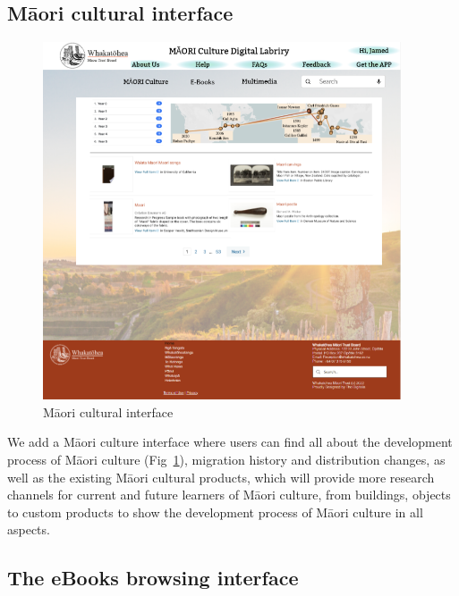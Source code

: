 \subsection{Māori cultural interface}

\begin{figure}[htbp]
  \centerline{\includegraphics[width=300pt]{images/3-1-3.png}}
  \caption{Māori cultural interface}
  \label{fig3.1.5}
\end{figure}

We add a Māori culture interface where users can find all about the development process of Māori culture (Fig~\ref{fig3.1.5}), migration history and distribution changes, as well as the existing Māori cultural products, which will provide more research channels for current and future learners of Māori culture, from buildings, objects to custom products to show the development process of Māori culture in all aspects.

\subsection{The eBooks browsing interface}

